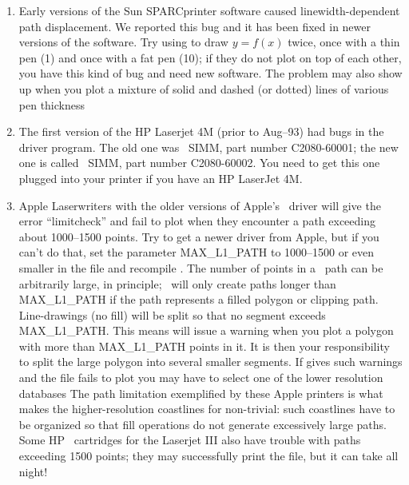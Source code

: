 \begin{enumerate}

\item 	Early versions of the Sun SPARCprinter software
caused linewidth-dependent path displacement.  We reported
this bug and it has been fixed in newer versions of the software.
Try using  to draw $y = f(x)$ twice, once with a
thin pen (1) and once with a fat pen (10);
if they do not plot on top of each other, you have this kind
of bug and need new software.  The problem may also show up
when you plot a mixture of solid and dashed (or dotted) lines
of various pen thickness


\item The first version of the HP Laserjet 4M (prior to Aug--93)
had bugs in the driver program.  The old one was
\PS\ SIMM, part number C2080-60001; the new one
is called \PS\ SIMM, part number C2080-60002.
You need to get this one plugged into your printer if you have
an HP LaserJet 4M.


\item Apple Laserwriters with the older versions of Apple's
\PS\ driver will give the error ``limitcheck''
and fail to plot when they encounter a path exceeding about
1000--1500 points.  Try to get a newer driver from Apple, but
if you can't do that, set the parameter MAX\_L1\_PATH to
1000--1500 or even smaller in the file 
and recompile \GMT.  The number of points in a \PS\
path can be arbitrarily large, in principle; \GMT\ will only
create paths longer than MAX\_L1\_PATH if the path represents
a filled polygon or clipping path.  Line-drawings (no fill)
will be split so that no segment exceeds MAX\_L1\_PATH.
This means   will issue a warning when you
plot a polygon with more than MAX\_L1\_PATH points in it.  It is
then your responsibility to split the large polygon into several
smaller segments.  If \GMTprog{pscoast} gives such warnings and the
file fails to plot you may have to select one of the lower
resolution databases  The path limitation exemplified by these
Apple printers is what makes the higher-resolution coastlines
for  non-trivial:  such coastlines have to be
organized so that fill operations do not generate excessively
large paths.  Some HP \PS\ cartridges for the
Laserjet III also have trouble with paths exceeding 1500
points; they may successfully print the file, but it can take
all night!


\end{enumerate}

